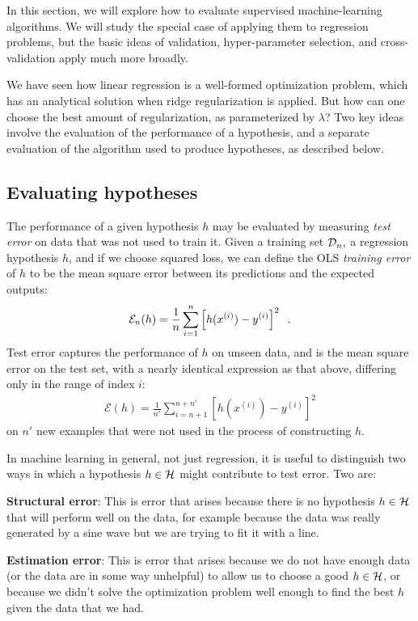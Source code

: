 In this section, we will explore how to evaluate supervised
machine-learning algorithms.  We will study the special case of
applying them to regression problems, but the basic ideas of
validation, hyper-parameter selection, and cross-validation apply much
more
broadly.

We have seen how linear regression is a well-formed optimization
problem, which has an analytical solution when ridge regularization is
applied.  But how can one choose the best amount of regularization, as
parameterized by $\lambda$?  Two key ideas involve the evaluation of
the performance of a hypothesis, and a separate evaluation of the
algorithm used to produce hypotheses, as described below.

\subsection{Evaluating hypotheses}

The performance of a given hypothesis $h$ may be evaluated by
measuring {\em test error} on data that was not used to train it.
%
Given a training set ${\cal D}_n,$ a regression hypothesis $h$, and if we choose squared loss, we can define the OLS {\em{training error}} of $h$ to be the mean square error between its predictions and the expected outputs:
\begin{eqnarray*}
  \mathcal{E}_n(h) = \frac{1}{n}\sum_{i = 1}^{n} \left[ h(x^{(i)}) - y^{(i)} \right]^2
  \;\;.
\end{eqnarray*}
Test error captures the performance of $h$ on unseen data, and is the
mean square error on the test set, with a nearly identical expression
as that above, differing only in the range of index $i$:
\begin{eqnarray*}
  \mathcal{E}(h) = \frac{1}{n'}\sum_{i = n + 1}^{n + n'} \left[ h(x^{(i)}) - y^{(i)} \right]^2
\end{eqnarray*}
on $n'$ new examples that were not used in the process of constructing $h$.

In machine learning in general, not just regression, it is useful to
distinguish two ways in which a hypothesis $h \in {\cal H}$ might
contribute to test error. Two are:
\begin{description}
  \item{\bf Structural error}: This is error that arises because there
        is no hypothesis $h \in {\cal H}$ that will perform well on the data,
        for example because the data was really generated by a sine wave but
        we are trying to fit it with a line.
  \item{\bf Estimation  error}:  This is error that arises because we
        do not have enough data (or the data are in some way unhelpful) to
        allow us to choose a good $h \in {\cal H}$, or because we didn't
        solve the optimization problem well enough to find the best $h$
        given the data that we had.
\end{description}

